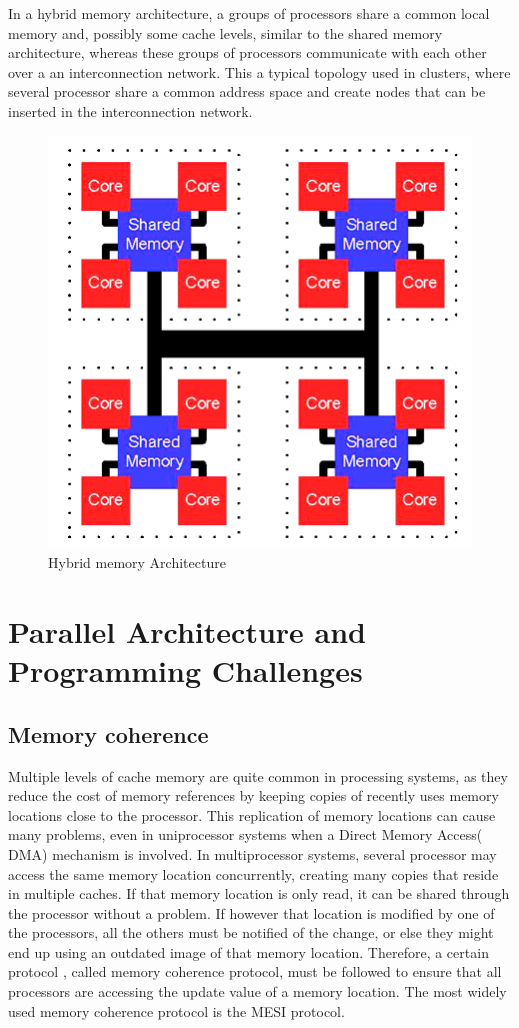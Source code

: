 In a hybrid memory architecture, a groups of processors share a common local memory and, possibly some cache levels, similar to the shared memory architecture, whereas these groups of processors communicate with each other over a  an interconnection network. This a typical topology used in clusters, where several processor share a common address space and create nodes that can be inserted in the interconnection network.

\begin{figure}
 \centering
  \includegraphics[scale=1.5]{hybrid_memory.jpg}
\caption{Hybrid memory Architecture}
\label{Hybrid memory architecture}
\end{figure}

\section{Parallel Architecture and Programming Challenges}
\subsection{Memory coherence}

Multiple levels of cache memory are quite common in processing systems, as they reduce the cost of memory references by keeping copies of recently uses memory locations close to the processor. This replication of memory locations can cause many problems, even in uniprocessor systems when a Direct Memory Access( DMA) mechanism is involved. In multiprocessor systems, several processor may access the same memory location concurrently, creating many copies that reside in multiple caches. If that memory location is only read, it can be shared through the processor without a problem. If however that location is modified by one of the processors, all the others must be notified of the change, or else they might end up using an outdated image of that memory location. Therefore, a certain protocol , called memory coherence protocol, must be followed to ensure that all processors are accessing the update value of a memory location. The most widely used memory coherence protocol is the MESI protocol.


